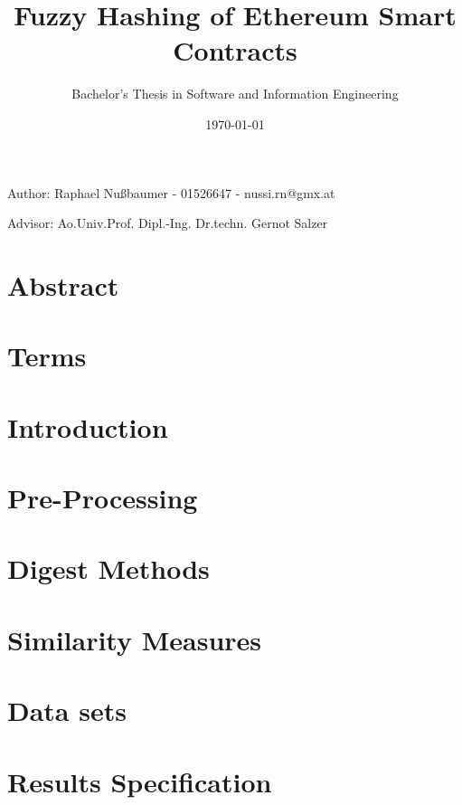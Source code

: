 \documentclass[]{article}
\title{Fuzzy Hashing of Ethereum Smart Contracts}
\author{Bachelor's Thesis in Software and Information Engineering}
\date{\today}
\begin{document}
\maketitle
\begin{center}
  Author: Raphael Nußbaumer - 01526647 - nussi.rn@gmx.at

  Advisor: Ao.Univ.Prof. Dipl.-Ing. Dr.techn. Gernot Salzer
\end{center}

\section{Abstract}



\section{Terms}


\section{Introduction}


\section{Pre-Processing}


\section{Digest Methods}


\section{Similarity Measures}


\section{Data sets}


\section{Results Specification}

\end{document}

